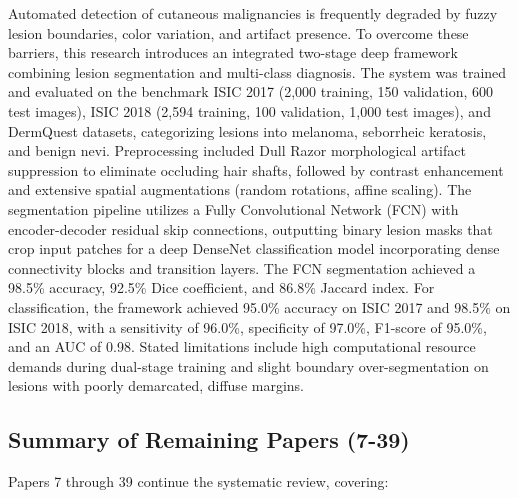 \documentclass[conference]{IEEEtran}
\begin{document}
Automated detection of cutaneous malignancies is frequently degraded by fuzzy lesion boundaries, color variation, and artifact presence. To overcome these barriers, this research introduces an integrated two-stage deep framework combining lesion segmentation and multi-class diagnosis. The system was trained and evaluated on the benchmark ISIC 2017 (2,000 training, 150 validation, 600 test images), ISIC 2018 (2,594 training, 100 validation, 1,000 test images), and DermQuest datasets, categorizing lesions into melanoma, seborrheic keratosis, and benign nevi. Preprocessing included Dull Razor morphological artifact suppression to eliminate occluding hair shafts, followed by contrast enhancement and extensive spatial augmentations (random rotations, affine scaling). The segmentation pipeline utilizes a Fully Convolutional Network (FCN) with encoder-decoder residual skip connections, outputting binary lesion masks that crop input patches for a deep DenseNet classification model incorporating dense connectivity blocks and transition layers. The FCN segmentation achieved a 98.5\% accuracy, 92.5\% Dice coefficient, and 86.8\% Jaccard index. For classification, the framework achieved 95.0\% accuracy on ISIC 2017 and 98.5\% on ISIC 2018, with a sensitivity of 96.0\%, specificity of 97.0\%, F1-score of 95.0\%, and an AUC of 0.98. Stated limitations include high computational resource demands during dual-stage training and slight boundary over-segmentation on lesions with poorly demarcated, diffuse margins.


\subsection{Summary of Remaining Papers (7-39)}

Papers 7 through 39 continue the systematic review, covering:
\end{document}
